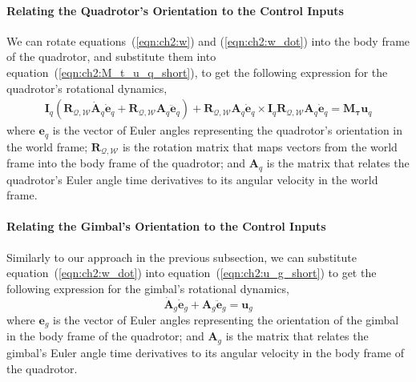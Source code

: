 \paragraph{Relating the Quadrotor's Orientation to the Control Inputs}

We can rotate equations~(\ref{eqn:ch2:w}) and (\ref{eqn:ch2:w_dot}) into the body frame of the quadrotor, and substitute them into equation~(\ref{eqn:ch2:M_t_u_q_short}), to get the following expression for the quadrotor's rotational dynamics,
%
\begin{equation}
\begin{aligned}
\mathbf{I}_{q} ( \mathbf{R}_{\mathcal{Q},\mathcal{W}} \dot{\mathbf{A}}_q \dot{\mathbf{e}}_q + \mathbf{R}_{\mathcal{Q},\mathcal{W}} \mathbf{A}_q \ddot{\mathbf{e}}_q ) + \mathbf{R}_{\mathcal{Q},\mathcal{W}} \mathbf{A}_q \dot{\mathbf{e}}_q \times \mathbf{I}_q \mathbf{R}_{\mathcal{Q},\mathcal{W}} \mathbf{A}_q \dot{\mathbf{e}}_q
=
\mathbf{M}_{\mathbf{\tau}} \mathbf{u}_q
\end{aligned}
\label{eqn:ch2:M_t_u_q_long}
\end{equation}
%
where
$\mathbf{e}_q$ is the vector of Euler angles representing the quadrotor's orientation in the world frame; 
$\mathbf{R}_{\mathcal{Q},\mathcal{W}}$ is the rotation matrix that maps vectors from the world frame into the body frame of the quadrotor;
and $\mathbf{A}_q$ is the matrix that relates the quadrotor's Euler angle time derivatives to its angular velocity in the world frame.

\paragraph{Relating the Gimbal's Orientation to the Control Inputs}

Similarly to our approach in the previous subsection, we can substitute equation~(\ref{eqn:ch2:w_dot}) into equation~(\ref{eqn:ch2:u_g_short}) to get the following expression for the gimbal's rotational dynamics,       
%
\begin{equation}
\dot{\mathbf{A}}_g \dot{\mathbf{e}}_g + \mathbf{A}_g \ddot{\mathbf{e}}_g = \mathbf{u}_g
\label{eqn:ch2:u_g_long}
\end{equation}
%
where
$\mathbf{e}_g$ is the vector of Euler angles representing the orientation of the gimbal in the body frame of the quadrotor;
and $\mathbf{A}_g$ is the matrix that relates the gimbal's Euler angle time derivatives to its angular velocity in the body frame of the quadrotor.

